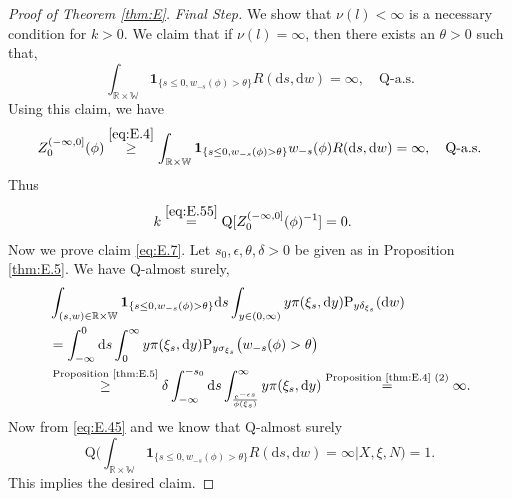 \documentclass[12pt,a4paper]{amsart}
\numberwithin{equation}{section}
\theoremstyle{plain}
\theoremstyle{definition}
\theoremstyle{remark}
\begin{document}
\begin{proof}[Proof of Theorem \ref{thm:E}]
\emph{Final Step.} We show that $\nu(l)<\infty$ is a necessary condition for $k>0$.
	We claim that if $\nu(l) = \infty$, then there exists an $\theta>0$ such that,
\begin{equation} \label{eq:E.7}
	\int_{\mathbb R\times \mathbb W}\mathbf 1_{\{s\leq 0, w_{-s}(\phi)>\theta\}} R(\mathrm ds,\mathrm dw)
	= \infty,
	\quad \mathrm Q\text{-a.s.}
\end{equation}
	Using this claim, we have
\begin{equation}
	Z_0^{(-\infty, 0]}(\phi)
	\overset{\eqref{eq:E.4}} \geq \int_{\mathbb R\times \mathbb W} \mathbf 1_{\{s\leq 0, w_{-s}(\phi)>\theta\}} w_{-s}(\phi) R(\mathrm ds,\mathrm dw)
	= \infty,
	\quad \mathrm Q\text{-a.s.}
\end{equation}
	Thus
\begin{align}
	& k \overset{\eqref{eq:E.55}}= \mathrm Q[Z^{(-\infty,0]}_0(\phi)^{-1}] = 0.
\end{align}
	Now we prove claim \eqref{eq:E.7}.
	Let $s_0, \epsilon, \theta, \delta > 0$ be given as in Proposition \ref{thm:E.5}.
	We have $\mathrm Q$-almost surely,
\begin{align}
	  & \int_{(s,w)\in \mathbb R\times \mathbb W} 
\mathbf 1_{\{s\leq 0, w_{-s}(\phi)> \theta\}}
	  \mathrm ds  \int_{y\in (0,\infty)} y \pi(\xi_s, \mathrm dy) \mathrm P_{y\delta_{\xi_s}}(\mathrm dw)
	\\&= \int_{-\infty}^0 \mathrm ds \int_0^\infty  y \pi(\xi_s, \mathrm dy) \mathrm P_{y \sigma_{\xi_s}}\big(w_{-s}(\phi)>\theta\big)
	\\&\overset{\text{Proposition \ref{thm:E.5}}}\geq \delta \int_{-\infty}^{-s_0} \mathrm ds
 \int_{\frac{e^{-\epsilon s}}{\phi(\xi_s)}}^\infty  y \pi(\xi_s, \mathrm dy)
  	\overset{\text{Proposition \ref{thm:E.4} (2)}}= \infty.
\end{align}
	Now from \eqref{eq:E.45} and \cite[Theorem 2.7(i)]{Kyprianou2014Fluctuations} we know that $\mathrm Q$-almost surely
\begin{equation}
	\mathrm Q \Big(\int_{\mathbb R\times \mathbb W}\mathbf 1_{\{s\leq 0, w_{-s}(\phi)>\theta\}} R(\mathrm ds,\mathrm dw)
	= \infty\Big| X, \xi, N\Big)  = 1.
\end{equation}
	This implies the desired claim.
\end{proof}
\end{document}
